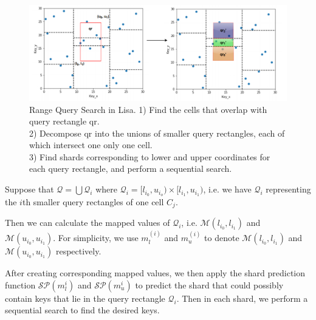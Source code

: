\begin{figure}[t]
    \centering
    \includegraphics[width=1\textwidth]{graphs/range_query_lisa.png}
    \caption{Range Query Search in Lisa.
    1) Find the cells that overlap with query rectangle qr. \\
    2) Decompose qr into the unions of smaller query rectangles, each of which intersect one only one cell. \\
    3) Find shards corresponding to lower and upper coordinates for each query rectangle, and perform a sequential search. }
    \label{fig:Range_Query_Lisa}
\end{figure}

 Suppose that $\mathcal{Q}=\bigcup \mathcal{Q}_i$ where $\mathcal{Q}_i=[l_{i_0}, u_{i_o})\times [l_{i_1}, u_{i_1})$, i.e. we have $\mathcal{Q}_i$ representing the $i$th smaller query rectangles of one cell $C_j$.
 
 Then we can calculate the mapped values of $\mathcal{Q}_i$, i.e. $\mathcal{M}(l_{i_0}, l_{i_1})$ and $\mathcal{M}(u_{i_0}, u_{i_1})$. For simplicity, we use $m_l^{(i)}$ and $m_u^{(i)}$ to denote $\mathcal{M}(l_{i_0}, l_{i_1})$ and $\mathcal{M}(u_{i_0}, u_{i_1})$ respectively.
 
After creating corresponding mapped values, we then apply the shard prediction function $\mathcal{SP}(m_{l}^{i})$ and $\mathcal{SP}(m_{u}^{i})$ to predict the shard that could possibly contain keys that lie in the query rectangle $\mathcal{Q}_i$. Then in each shard, we perform a sequential search to find the desired keys. 

